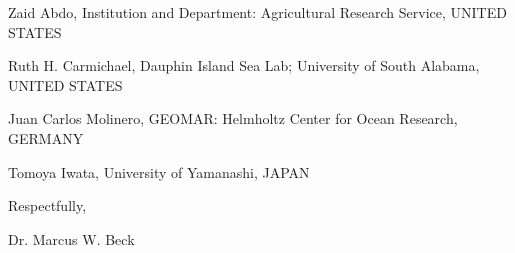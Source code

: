 \documentclass[a4paper,12pt]{article}
\begin{document}
Zaid Abdo,
Institution and Department: Agricultural Research Service,
UNITED STATES

Ruth H. Carmichael,
Dauphin Island Sea Lab; University of South Alabama,
UNITED STATES

Juan Carlos Molinero,
GEOMAR: Helmholtz Center for Ocean Research,
GERMANY

Tomoya Iwata,
University of Yamanashi,
JAPAN

\vspace{0.1in}

\hspace{4.5in}Respectfully,

\hspace{4.5in}Dr. Marcus W. Beck
\end{document}
